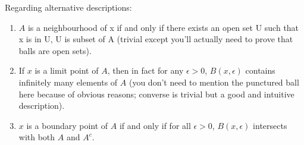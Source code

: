 \begin{prbm}
Regarding alternative descriptions:
\begin{enumerate}
\item $A$ is a neighbourhood of x if and only if there exists an open set U such that x is in U, U is subset of A (trivial except you'll actually need to prove that balls are open sets).
\item If $x$ is a limit point of $A$, then in fact for any $\epsilon>0$, $B(x,\epsilon)$ contains infinitely many elements of $A$ (you don't need to mention the punctured ball here because of obvious reasons; converse is trivial but a good and intuitive description).
\item $x$ is a boundary point of $A$ if and only if for all $\epsilon>0$, $B(x,\epsilon)$ intersects with both $A$ and $A^c$.
\end{enumerate}
\end{prbm}

